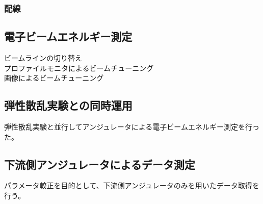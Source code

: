 \documentclass[a4paper,11pt,uplatex]{jsbook}
\begin{document}
\subsubsection{配線}

\subsection{電子ビームエネルギー測定}

ビームラインの切り替え\\
プロファイルモニタによるビームチューニング\\
画像によるビームチューニング\\

\subsection{弾性散乱実験との同時運用}
弾性散乱実験と並行してアンジュレータによる電子ビームエネルギー測定を行った。
\subsection{下流側アンジュレータによるデータ測定}
パラメータ較正を目的として、下流側アンジュレータのみを用いたデータ取得を行う。
\end{document}
